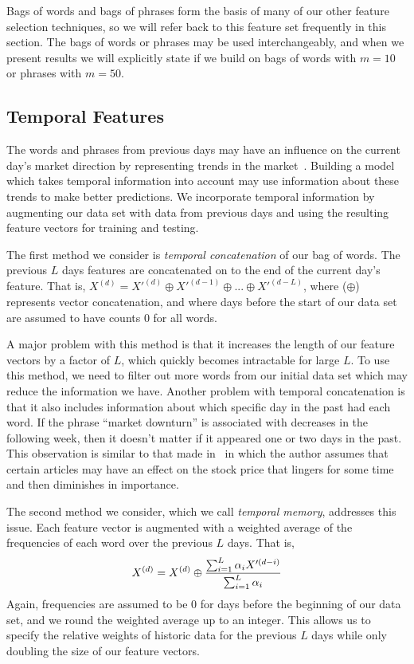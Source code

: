 \documentclass[10pt, twocolumn]{article}
\begin{document}
Bags of words and bags of phrases form the basis of many of our other feature selection techniques, so we will refer back to this feature set frequently in this section. The bags of words or phrases may be used interchangeably, and when we present results we will explicitly state if we build on bags of words with $m=10$ or phrases with $m=50$.

\subsection{Temporal Features}

The words and phrases from previous days may have an influence on the current day's market direction by representing trends in the market~\cite{mlstockmarket}. Building a model which takes temporal information into account may use information about these trends to make better predictions. We incorporate temporal information by augmenting our data set with data from previous days and using the resulting feature vectors for training and testing.

The first method we consider is \textit{temporal concatenation} of our bag of words. The previous $L$ days features are concatenated on to the end of the current day's feature. That is, $X^{(d)} = X'^{(d)} \oplus X'^{(d-1)} \oplus ... \oplus X'^{(d-L)}$, where ($\oplus$) represents vector concatenation, and where days before the start of our data set are assumed to have counts $0$ for all words.

A major problem with this method is that it increases the length of our feature vectors by a factor of $L$, which quickly becomes intractable for large $L$. To use this method, we need to filter out more words from our initial data set which may reduce the information we have. Another problem with temporal concatenation is that it also includes information about which specific day in the past had each word. If the phrase ``market downturn'' is associated with decreases in the following week, then it doesn't matter if it appeared one or two days in the past. This observation is similar to that made in~\cite{mlstockmarket} in which the author assumes that certain articles may have an effect on the stock price that lingers for some time and then diminishes in importance. 

The second method we consider, which we call \textit{temporal memory}, addresses this issue. Each feature vector is augmented with a weighted average of the frequencies of each word over the previous $L$ days. That is, $$\displaystyle X^{(d)} = X^{(d)} \oplus {{\sum^L_{i=1}{\alpha_i X'^{(d-i)}}} \over {\sum^L_{i=1}{\alpha_i}}}$$ Again, frequencies are assumed to be 0 for days before the beginning of our data set, and we round the weighted average up to an integer. This allows us to specify the relative weights of historic data for the previous $L$ days while only doubling the size of our feature vectors. 
\end{document}
